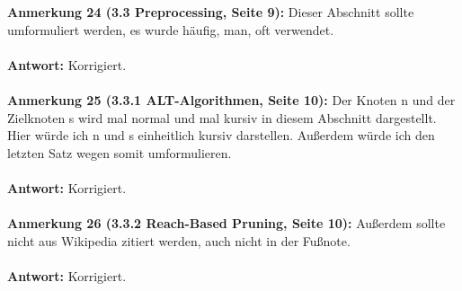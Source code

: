 \documentclass[a4paper,12pt]{book}
\begin{document}
\\ \\
\textbf{Anmerkung 24 (3.3 Preprocessing, Seite 9):} 
Dieser Abschnitt sollte umformuliert werden, es wurde \glqq häufig, man, oft\grqq{} verwendet. 
\\ \\
\textbf{Antwort:}
Korrigiert. 
\\ \\
\textbf{Anmerkung 25 (3.3.1 ALT-Algorithmen, Seite 10):}
Der Knoten n und der Zielknoten s wird mal normal und mal kursiv in diesem Abschnitt dargestellt. Hier würde ich n und s einheitlich kursiv darstellen. Außerdem würde ich den letzten Satz wegen \glqq somit\grqq{} umformulieren.
\\ \\
\textbf{Antwort:}
Korrigiert.
\\ \\
\textbf{Anmerkung 26 (3.3.2 Reach-Based Pruning, Seite 10):}
Außerdem sollte nicht aus Wikipedia zitiert werden, auch nicht in der Fußnote.
\\ \\
\textbf{Antwort:}
Korrigiert.
\end{document}
